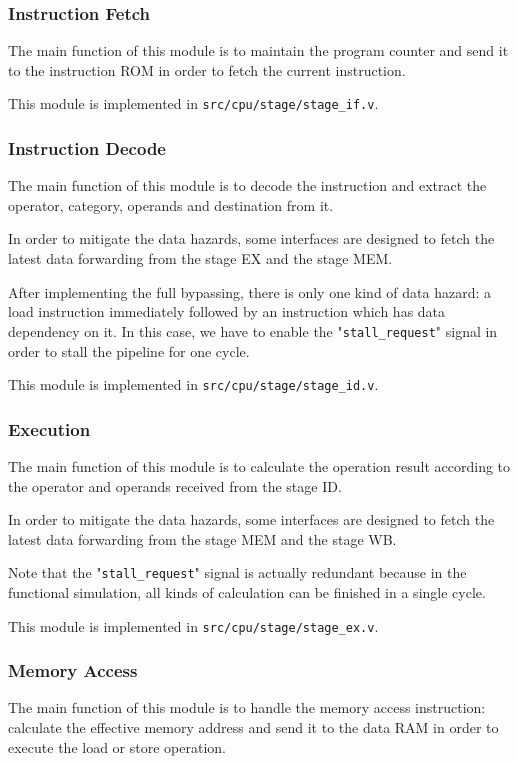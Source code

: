\documentclass{article}
\begin{document}
\subsubsection{Instruction Fetch}
The main function of this module is to maintain the program counter and send it to the instruction ROM in order to fetch the current instruction.


This module is implemented in \texttt{src/cpu/stage/stage\_if.v}.

\subsubsection{Instruction Decode}
The main function of this module is to decode the instruction and extract the operator, category, operands and destination from it.


In order to mitigate the data hazards, some interfaces are designed to fetch the latest data forwarding from the stage EX and the stage MEM.

After implementing the full bypassing, there is only one kind of data hazard: a load instruction immediately followed by an instruction which has data dependency on it. In this case, we have to enable the "\texttt{stall\_request}" signal in order to stall the pipeline for one cycle.

This module is implemented in \texttt{src/cpu/stage/stage\_id.v}.

\newpage
\subsubsection{Execution}
The main function of this module is to calculate the operation result according to the operator and operands received from the stage ID.


In order to mitigate the data hazards, some interfaces are designed to fetch the latest data forwarding from the stage MEM and the stage WB.

Note that the "\texttt{stall\_request}" signal is actually redundant because in the functional simulation, all kinds of calculation can be finished in a single cycle.

This module is implemented in \texttt{src/cpu/stage/stage\_ex.v}.

\newpage
\subsubsection{Memory Access}
The main function of this module is to handle the memory access instruction: calculate the effective memory address and send it to the data RAM in order to execute the load or store operation.

\end{document}
